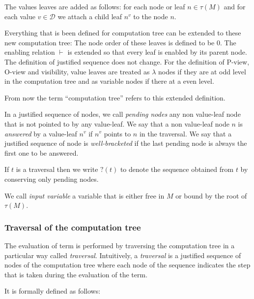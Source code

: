 The values leaves are added as follows: for each node or leaf $n \in \tau(M)$
and for each value $v \in \mathcal{D}$ we attach a child leaf $n^v$ to the node $n$.

Everything that is been defined for computation tree can be extended to these new computation tree:
The node order of these leaves is defined to be $0$. The enabling relation $\vdash$ is extended so that every leaf is enabled
by its parent node. The definition of justified sequence does not change.
For the definition of P-view, O-view and visibility, value leaves are treated as $\lambda$ nodes if they are at odd level in the computation tree and
as variable nodes if there at a even level.

From now the term ``computation tree'' refers to this extended definition.

In a justified sequence of nodes, we call \emph{pending nodes} any
non value-leaf node that is not pointed to by any value-leaf. We say
that a non value-leaf node $n$ is \emph{answered} by a value-leaf
$n^v$ if $n^v$ points to $n$ in the traversal. We say that a
justified sequence of node is \emph{well-bracketed} if the last
pending node is always the first one to be answered.

If $t$ is a traversal then we write $?(t)$ to denote the sequence
obtained from $t$ by conserving only pending nodes.

We call \emph{input variable} a variable that is either free in $M$ or bound by the root of $\tau(M)$.

\subsubsection{Traversal of the computation tree}
The evaluation of term is performed by traversing the computation tree in a particular way called
\emph{traversal}. Intuitively, a \emph{traversal} is a justified sequence of nodes of the computation tree where each node
of the sequence indicates the step that is taken during the evaluation of the term.

It is formally defined as follows:

